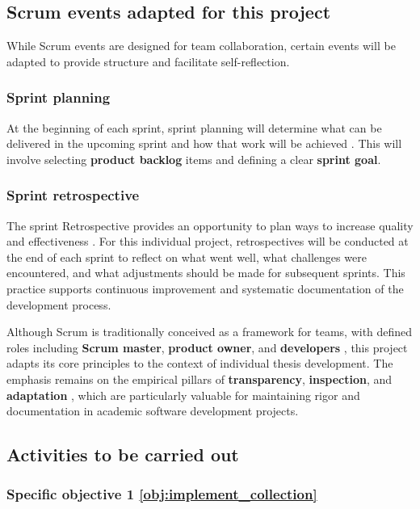 \subsection{Scrum events adapted for this project}

While Scrum events are designed for team collaboration, certain events will be adapted to provide structure and facilitate self-reflection.

\subsubsection{Sprint planning}

At the beginning of each sprint, sprint planning will determine what can be delivered in the upcoming sprint and how that work will be achieved \parencite{schwaber2020scrum}. This will involve selecting \textbf{product backlog} items and defining a clear \textbf{sprint goal}.

\subsubsection{Sprint retrospective}

The sprint Retrospective provides an opportunity to plan ways to increase quality and effectiveness \parencite{schwaber2020scrum}. For this individual project, retrospectives will be conducted at the end of each sprint to reflect on what went well, what challenges were encountered, and what adjustments should be made for subsequent sprints. This practice supports continuous improvement and systematic documentation of the development process.

Although Scrum is traditionally conceived as a framework for teams, with defined roles including \textbf{Scrum master}, \textbf{product owner}, and \textbf{developers} \parencite{schwaber2020scrum}, this project adapts its core principles to the context of individual thesis development. The emphasis remains on the empirical pillars of \textbf{transparency}, \textbf{inspection}, and \textbf{adaptation} \parencite{schwaber2020scrum}, which are particularly valuable for maintaining rigor and documentation in academic software development projects.

\subsection{Activities to be carried out}

\subsubsection{Specific objective 1 \ref{obj:implement_collection}}

